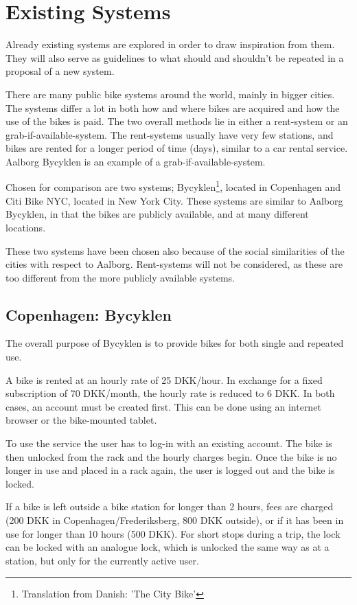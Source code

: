 \section{Existing Systems}

Already existing systems are explored in order to draw inspiration from them.
They will also serve as guidelines to what should and shouldn't be repeated in a proposal of a new system.

There are many public bike systems around the world, mainly in bigger cities.
The systems differ a lot in both how and where bikes are acquired and how the use of the bikes is paid.
The two overall methods lie in either a rent-system or an grab-if-available-system.
The rent-systems usually have very few stations, and bikes are rented for a longer period of time (days), similar to a car rental service.
Aalborg Bycyklen is an example of a grab-if-available-system.

Chosen for comparison are two systems; Bycyklen\footnote{Translation from Danish: 'The City Bike'}, located in Copenhagen and Citi Bike NYC, located in New York City.
These systems are similar to Aalborg Bycyklen, in that the bikes are publicly available, and at many different locations.

These two systems have been chosen also because of the social similarities of the cities with respect to Aalborg.
Rent-systems will not be considered, as these are too different from the more publicly available systems.

\subsection{Copenhagen: Bycyklen}
The overall purpose of Bycyklen\cite{cph_bycyklen}\cite{cph_bycyklen_conditions} is to provide bikes for both single and repeated use.

A bike is rented at an hourly rate of 25 DKK/hour.
In exchange for a fixed subscription of 70 DKK/month, the hourly rate is reduced to 6 DKK.
In both cases, an account must be created first.
This can be done using an internet browser or the bike-mounted tablet.

To use the service the user has to log-in with an existing account.
The bike is then unlocked from the rack and the hourly charges begin.
Once the bike is no longer in use and placed in a rack again, the user is logged out and the bike is locked.

If a bike is left outside a bike station for longer than 2 hours, fees are charged (200 DKK in Copenhagen/Frederiksberg, 800 DKK outside), or if it has been in use for longer than 10 hours (500 DKK).
For short stops during a trip, the lock can be locked with an analogue lock, which is unlocked the same way as at a station, but only for the currently active user.

